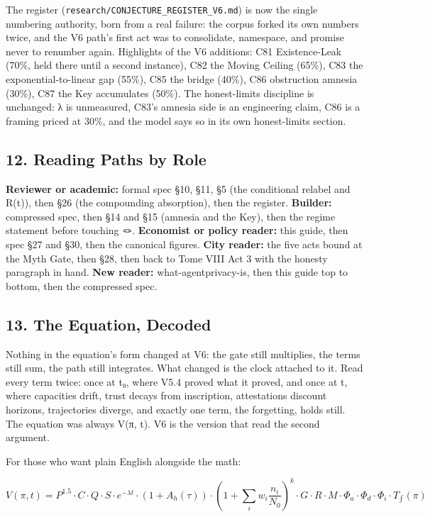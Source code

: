 \documentclass[
]{article}
\begin{document}
The register (\texttt{research/CONJECTURE\_REGISTER\_V6.md}) is now the
single numbering authority, born from a real failure: the corpus forked
its own numbers twice, and the V6 path's first act was to consolidate,
namespace, and promise never to renumber again. Highlights of the V6
additions: C81 Existence-Leak (70\%, held there until a second
instance), C82 the Moving Ceiling (65\%), C83 the exponential-to-linear
gap (55\%), C85 the bridge (40\%), C86 obstruction amnesia (30\%), C87
the Key accumulates (50\%). The honest-limits discipline is unchanged: λ
is unmeasured, C83's amnesia side is an engineering claim, C86 is a
framing priced at 30\%, and the model says so in its own honest-limits
section.

\subsection{12. Reading Paths by Role}\label{reading-paths-by-role}

\textbf{Reviewer or academic:} formal spec §10, §11, §5 (the conditional
relabel and R(t)), then §26 (the compounding absorption), then the
register. \textbf{Builder:} compressed spec, then §14 and §15 (amnesia
and the Key), then the regime statement before touching 🪢.
\textbf{Economist or policy reader:} this guide, then spec §27 and §30,
then the canonical figures. \textbf{City reader:} the five acts bound at
the Myth Gate, then §28, then back to Tome VIII Act 3 with the honesty
paragraph in hand. \textbf{New reader:} what-agentprivacy-is, then this
guide top to bottom, then the compressed spec.

\subsection{13. The Equation, Decoded}\label{the-equation-decoded}

Nothing in the equation's form changed at V6: the gate still multiplies,
the terms still sum, the path still integrates. What changed is the
clock attached to it. Read every term twice: once at t₀, where V5.4
proved what it proved, and once at t, where capacities drift, trust
decays from inscription, attestations discount horizons, trajectories
diverge, and exactly one term, the forgetting, holds still. The equation
was always V(π, t). V6 is the version that read the second argument.

For those who want plain English alongside the math:

\[V(\pi, t) = P^{1.5} \cdot C \cdot Q \cdot S \cdot e^{-\lambda t} \cdot (1 + A_h(\tau)) \cdot \left(1 + \sum_i w_i \frac{n_i}{N_0}\right)^k \cdot G \cdot R \cdot M \cdot \Phi_a \cdot \Phi_d \cdot \Phi_i \cdot T_\int(\pi)\]
\end{document}
